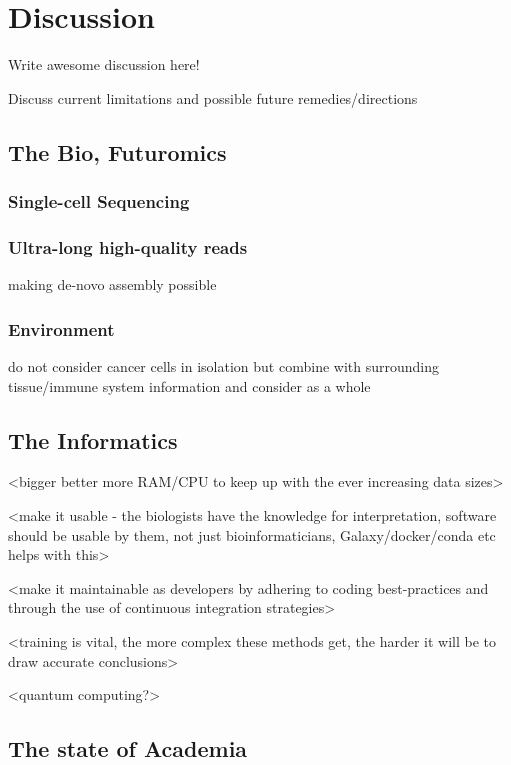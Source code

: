 \chapter{Discussion}
\label{discussion}
\setcounter{figure}{-1}
\setcounter{table}{-1}
\setcounter{section}{-1}
\setcounter{NAT@ctr}{-1}

Write awesome discussion here!

Discuss current limitations and possible future remedies/directions

\section{The Bio, Futuromics}

\subsection{Single-cell Sequencing}

\subsection{Ultra-long high-quality reads}
making de-novo assembly possible

\subsection{Environment}
do not consider cancer cells in isolation but combine with surrounding tissue/immune system information and consider as a whole


\section{The Informatics}

<bigger better more RAM/CPU to keep up with the ever increasing data sizes>

<make it usable - the biologists have the knowledge for interpretation, software should be usable by them, not just bioinformaticians, Galaxy/docker/conda etc helps with this>

<make it maintainable as developers by adhering to coding best-practices and through the use of continuous integration strategies>

<training is vital, the more complex these methods get, the harder it will be to draw accurate conclusions>

<quantum computing?>


\section{The state of Academia}


